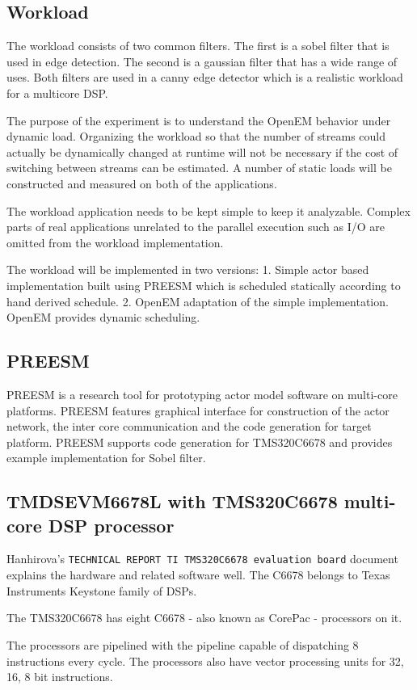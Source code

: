 \subsection{Workload}
The workload consists of two common filters. The first is a sobel filter that is used in edge detection. The second is a gaussian filter that has a wide range of uses. Both filters are used in a canny edge detector which is a realistic workload for a multicore DSP.

The purpose of the experiment is to understand the OpenEM behavior under dynamic load. Organizing the workload so that the number of streams could actually be dynamically changed at runtime will not be necessary if the cost of switching between streams can be estimated. A number of static loads will be constructed and measured on both of the applications.

The workload application needs to be kept simple to keep it analyzable. Complex parts of real applications unrelated to the parallel execution such as I/O are omitted from the workload implementation.

The workload will be implemented in two versions: 1. Simple actor based implementation built using PREESM which is scheduled statically according to hand derived schedule. 2. OpenEM adaptation of the simple implementation. OpenEM provides dynamic scheduling.
\subsection{PREESM}
PREESM is a research tool for prototyping actor model software on multi-core platforms. PREESM features graphical interface for construction of the actor network, the inter core communication and the code generation for target platform. PREESM supports code generation for TMS320C6678 and provides example implementation for Sobel filter.
\subsection{TMDSEVM6678L with TMS320C6678 multi-core DSP processor}
Hanhirova's {\tt TECHNICAL REPORT TI TMS320C6678 evaluation board} document explains the hardware and related software well. The C6678 belongs to Texas Instruments Keystone family of DSPs.

The TMS320C6678 has eight C6678 - also known as CorePac - processors on it.

The processors are pipelined with the pipeline capable of dispatching 8 instructions every cycle. The processors also have vector processing units for 32, 16, 8 bit instructions.

